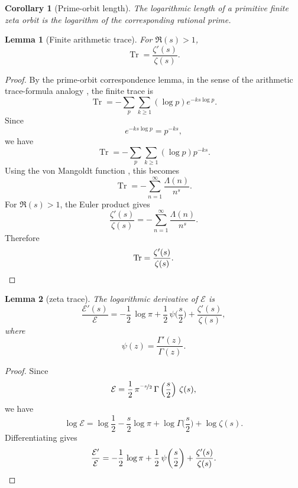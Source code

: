 \documentclass[pdflatex,sn-mathphys-num]{sn-jnl}
\DeclareMathOperator{\Tr}{Tr}
\theoremstyle{thmstyleone}
\newtheorem{lemma}{Lemma}
\newtheorem{corollary}{Corollary}
\theoremstyle{thmstyletwo}
\theoremstyle{thmstylethree}
\begin{document}
  \begin{corollary}[Prime-orbit length]
  The logarithmic length of a primitive finite zeta orbit is the logarithm of
  the corresponding rational prime.
  \end{corollary}

  \begin{lemma}[Finite arithmetic trace]
  For \(\Re(s)>1\),
  \[
  \Tr
  =
  \frac{\zeta'(s)}{\zeta(s)}.
  \]
  \end{lemma}

  \begin{proof}
  By the prime-orbit correspondence lemma, in the sense of the
  arithmetic trace-formula analogy \cite{Connes1999}, the
  finite trace is
  \[
  \Tr
  =
  -\sum_p\sum_{k\ge1}(\log p)e^{-ks\log p}.
  \]
  Since
  \[
  e^{-ks\log p}=p^{-ks},
  \]
  we have
  \[
  \Tr
  =
  -\sum_p\sum_{k\ge1}(\log p)p^{-ks}.
  \]
  Using the von Mangoldt function \cite{IwaniecKowalski2004}, this becomes
  \[
  \Tr
  =
  -\sum_{n=1}^{\infty}\frac{\Lambda(n)}{n^s}.
  \]
  For \(\Re(s)>1\), the Euler product gives
  \[
  \frac{\zeta'(s)}{\zeta(s)}
  =
  -\sum_{n=1}^{\infty}\frac{\Lambda(n)}{n^s}.
  \]
  Therefore
  \[
  \Tr
  =
  \frac{\zeta'(s)}{\zeta(s)}.\qedhere
  \]
  \end{proof}

  \begin{lemma}[zeta trace]
  The logarithmic derivative of \(\mathcal{E}\)
  \cite{Edwards1974,Titchmarsh1986} is
  \[
  \frac{\mathcal{E}'(s)}{\mathcal{E}}
  =
  -\frac12 \, \log\pi
  +
  \frac12 \, \psi\biggl(\frac s2\biggr)
  +
  \frac{\zeta'(s)}{\zeta(s)},
  \]
  where
  \[
  \psi(z)=\frac{\Gamma'(z)}{\Gamma(z)}.
  \]
  \end{lemma}

  \begin{proof}
  Since
  \[
  \mathcal{E}=\frac12 \, \pi^{\nicefrac{-s}{2}} \,
    \Gamma\left(\frac{s}{2}\right)\, \zeta(s),
  \]
  we have
  \[
  \log \mathcal{E}
  =
  \log\frac12
  -\frac{s}{2}\log\pi
  +\log\Gamma\biggl(\frac{s}{2}\biggr)
  +\log\zeta(s).
  \]
  Differentiating gives
  \[
  \frac{\mathcal{E}'}{\mathcal{E}}
  =
  -\frac12 \, \log\pi
  +
  \frac12 \, \psi\biggl(\frac s2\biggr)
  +
  \frac{\zeta'(s)}{\zeta(s)}.\qedhere
  \]
  \end{proof}
\end{document}
